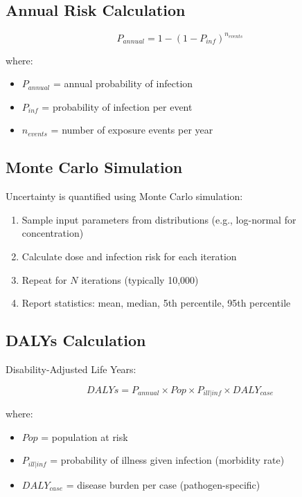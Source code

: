 \documentclass[11pt,a4paper]{article}
\begin{document}
\subsection{Annual Risk Calculation}

\begin{equation}
P_{annual} = 1 - (1 - P_{inf})^{n_{events}}
\end{equation}

where:
\begin{itemize}[leftmargin=*]
    \item $P_{annual}$ = annual probability of infection
    \item $P_{inf}$ = probability of infection per event
    \item $n_{events}$ = number of exposure events per year
\end{itemize}

\subsection{Monte Carlo Simulation}

Uncertainty is quantified using Monte Carlo simulation:

\begin{enumerate}[leftmargin=*]
    \item Sample input parameters from distributions (e.g., log-normal for concentration)
    \item Calculate dose and infection risk for each iteration
    \item Repeat for $N$ iterations (typically 10,000)
    \item Report statistics: mean, median, 5th percentile, 95th percentile
\end{enumerate}

\subsection{DALYs Calculation}

Disability-Adjusted Life Years:

\begin{equation}
DALYs = P_{annual} \times Pop \times P_{ill|inf} \times DALY_{case}
\end{equation}

where:
\begin{itemize}[leftmargin=*]
    \item $Pop$ = population at risk
    \item $P_{ill|inf}$ = probability of illness given infection (morbidity rate)
    \item $DALY_{case}$ = disease burden per case (pathogen-specific)
\end{itemize}
\end{document}
